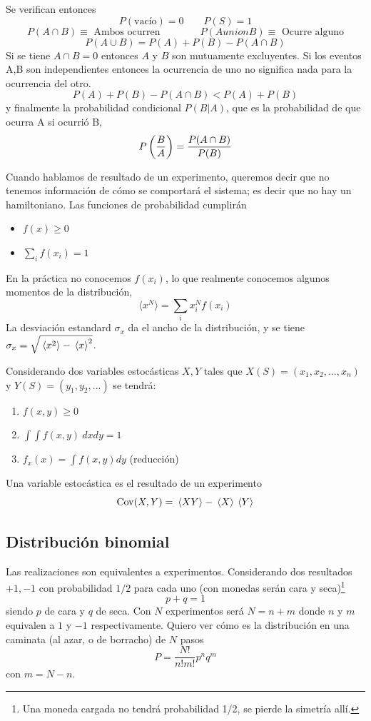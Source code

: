 \documentclass[10pt,oneside]{CBFT_book}
\begin{document}
Se verifican entonces
\[
	P(\text{vacío}) = 0 \qquad P(S) = 1
\]
\[
	P(A \cap B ) \equiv \text{ Ambos ocurren}
	\qquad \qquad 
	P(A union B ) \equiv \text{ Ocurre alguno}
\]
\[
	P( A \cup B) = P(A) + P(B) - P(A \cap B)
\]
Si se tiene $ A \cap B = 0$ entonces $A$ y $B$ son mutuamente excluyentes.
Si los eventos A,B son independientes entonces la ocurrencia de uno no significa
nada para la ocurrencia del otro.
\[
	P(A) + P(B) - P(A\cap B) < P(A) + P(B) 
\]
y finalmente la probabilidad condicional $P(B|A)$, que es la probabilidad de
que ocurra A si ocurrió B,
\[
	P\left( \frac{ B }{ A } \right) = \frac{P(A\cap B)}{P(B)}
\]

Cuando hablamos de resultado de un experimento, queremos decir que no tenemos 
información de cómo se comportará el sistema; es decir que no hay un hamiltoniano.
Las funciones de probabilidad cumplirán
\begin{itemize}
 \item $f(x) \geq 0$
 \item $\sum_i f(x_i) = 1$
\end{itemize}

En la práctica no conocemos $f(x_i)$, lo que realmente conocemos algunos 
momentos de la distribución,
\[
	\langle x^N \rangle = \sum_i x^N_i f(x_i) 
\]
La desviación estandard $\sigma_x$ da el ancho de la distribución, y se tiene
$\sigma_x = \sqrt{\:\left\langle x^2 \right\rangle - \:\left\langle x \right\rangle^2 }$.

Considerando dos variables estocásticas $X,Y$ tales que 
$X(S)=(x_1,x_2,...,x_n)$ y $Y(S)=(y_1,y_2,...)$
se tendrá:
\begin{enumerate}
 \item $ f(x,y) \geq 0 $
 \item $ \int \int f(x,y) \: dx dy = 1 $
 \item $ f_x(x) = \int f(x,y) dy $ (reducción)
\end{enumerate}


Una variable estocástica es el resultado de un experimento
\[
	\text{Cov}(X,Y) = \:\left\langle XY \right\rangle - \:\left\langle X \right\rangle \:\left\langle Y \right\rangle
\]

\subsection{Distribución binomial}

Las realizaciones son equivalentes a experimentos.
Considerando dos resultados $+1,-1$ con probabilidad $1/2$ para cada uno (con monedas
serán cara y seca)\footnote{Una moneda cargada no tendrá probabilidad 1/2, se pierde
la simetría allí.}
\[
	p + q = 1
\]
siendo $p$ de cara y $q$ de seca. 
Con $N$ experimentos será $N=n+m$ donde $n$ y $m$ equivalen a $1$ y $-1$ respectivamente.
Quiero ver cómo es la distribución en una caminata (al azar, o de borracho) de
$N$ pasos
\[
	P = \frac{N!}{n! m!} p^n q^m
\]
con $m = N-n$.
\end{document}
